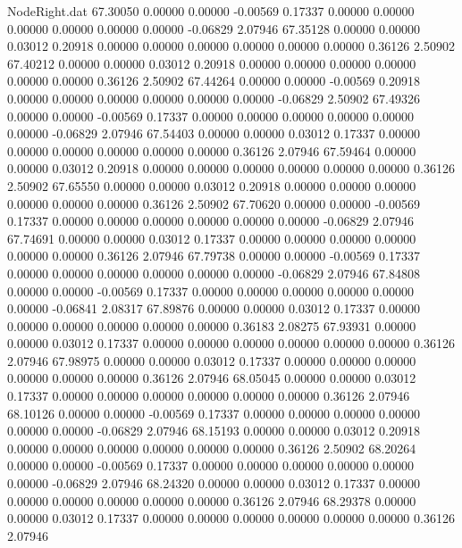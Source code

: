 \begin{filecontents}{NodeRight.dat}
  67.30050    0.00000    0.00000    -0.00569    0.17337    0.00000    0.00000    0.00000    0.00000    0.00000    0.00000   -0.06829    2.07946
  67.35128    0.00000    0.00000     0.03012    0.20918    0.00000    0.00000    0.00000    0.00000    0.00000    0.00000    0.36126    2.50902
  67.40212    0.00000    0.00000     0.03012    0.20918    0.00000    0.00000    0.00000    0.00000    0.00000    0.00000    0.36126    2.50902
  67.44264    0.00000    0.00000    -0.00569    0.20918    0.00000    0.00000    0.00000    0.00000    0.00000    0.00000   -0.06829    2.50902
  67.49326    0.00000    0.00000    -0.00569    0.17337    0.00000    0.00000    0.00000    0.00000    0.00000    0.00000   -0.06829    2.07946
  67.54403    0.00000    0.00000     0.03012    0.17337    0.00000    0.00000    0.00000    0.00000    0.00000    0.00000    0.36126    2.07946
  67.59464    0.00000    0.00000     0.03012    0.20918    0.00000    0.00000    0.00000    0.00000    0.00000    0.00000    0.36126    2.50902
  67.65550    0.00000    0.00000     0.03012    0.20918    0.00000    0.00000    0.00000    0.00000    0.00000    0.00000    0.36126    2.50902
  67.70620    0.00000    0.00000    -0.00569    0.17337    0.00000    0.00000    0.00000    0.00000    0.00000    0.00000   -0.06829    2.07946
  67.74691    0.00000    0.00000     0.03012    0.17337    0.00000    0.00000    0.00000    0.00000    0.00000    0.00000    0.36126    2.07946
  67.79738    0.00000    0.00000    -0.00569    0.17337    0.00000    0.00000    0.00000    0.00000    0.00000    0.00000   -0.06829    2.07946
  67.84808    0.00000    0.00000    -0.00569    0.17337    0.00000    0.00000    0.00000    0.00000    0.00000    0.00000   -0.06841    2.08317
  67.89876    0.00000    0.00000     0.03012    0.17337    0.00000    0.00000    0.00000    0.00000    0.00000    0.00000    0.36183    2.08275
  67.93931    0.00000    0.00000     0.03012    0.17337    0.00000    0.00000    0.00000    0.00000    0.00000    0.00000    0.36126    2.07946
  67.98975    0.00000    0.00000     0.03012    0.17337    0.00000    0.00000    0.00000    0.00000    0.00000    0.00000    0.36126    2.07946
  68.05045    0.00000    0.00000     0.03012    0.17337    0.00000    0.00000    0.00000    0.00000    0.00000    0.00000    0.36126    2.07946
  68.10126    0.00000    0.00000    -0.00569    0.17337    0.00000    0.00000    0.00000    0.00000    0.00000    0.00000   -0.06829    2.07946
  68.15193    0.00000    0.00000     0.03012    0.20918    0.00000    0.00000    0.00000    0.00000    0.00000    0.00000    0.36126    2.50902
  68.20264    0.00000    0.00000    -0.00569    0.17337    0.00000    0.00000    0.00000    0.00000    0.00000    0.00000   -0.06829    2.07946
  68.24320    0.00000    0.00000     0.03012    0.17337    0.00000    0.00000    0.00000    0.00000    0.00000    0.00000    0.36126    2.07946
  68.29378    0.00000    0.00000     0.03012    0.17337    0.00000    0.00000    0.00000    0.00000    0.00000    0.00000    0.36126    2.07946
\end{filecontents}
